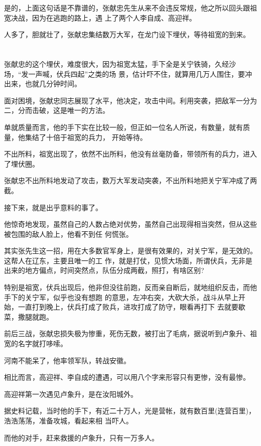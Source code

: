 \documentclass[11pt,a4paper,onecolumn]{article}
\begin{document}
是的，上面这句话是不靠谱的，张献忠先生从来不会违反常规，他之所以回头跟祖宽决战，因为在逃跑的路上，遇
上了两个人\myrule 李自成、高迎祥。

人多了，胆就壮了，张献忠集结数万大军，在龙门设下埋伏，等待祖宽的到来。

\section[\thesection]{}

张献忠的这个埋伏，难度很大，因为祖宽太猛，手下全是关宁铁骑，久经沙场，``发一声喊，伏兵四起''之类的场
景，估计吓不住，就算用几万人围住，要冲出来，也就几分钟时间。

面对困境，张献忠同志展现了水平，他决定，攻击中间。利用突袭，把敌军一分为二，分而击破，这是唯一的方法。

单就质量而言，他的手下实在比较一般，但正如一位名人所说，有数量，就有质量，他集结了十倍于祖宽的兵力，
开始等待。

不出所料，祖宽出现了，依然不出所料，他没有丝毫防备，带领所有的兵力，进入了埋伏圈。

张献忠不出所料地发动了攻击，数万大军发动突袭，不出所料地把关宁军冲成了两截。

接下来，就是出乎意料的事了。

他惊奇地发现，虽然自己的人数占绝对优势，虽然自己出现得相当突然，但从这些被包围的敌人脸上，他看不到任
何慌张。

其实张先生这一招，用在大多数官军身上，是很有效果的，对关宁军，是无效的。这帮人在辽东，主要且唯一的工
作，就是打仗，见惯大场面，所谓伏兵，无非是出来的地方偏点，时间突然点，队伍分成两截，照打，有啥区别?

特别是祖宽，伏兵出现后，他非但没往前跑，反而亲自断后，就地组织反击，而他手下的关宁军，似乎也没有想跑
的意思，左冲右突，大砍大杀，战斗从早上开始，一直打到晚上，伏兵打成了败兵，进攻打成了防守，眼看再打下
去就要歇菜，撒腿就跑。

前后三战，张献忠损失极为惨重，死伤无数，被打出了毛病，据说听到卢象升、祖宽的名字就打哆嗦。

河南不能呆了，他率领军队，转战安徽。

相比而言，高迎祥、李自成的遭遇，可以用八个字来形容\myrule 只有更惨，没有最惨。

高迎祥第一次遇见卢象升，是在汝阳城外。

据史料记载，当时他的手下，有近二十万人，光是营帐，就有数百里(连营百里)，浩浩荡荡，准备攻城，看起来相
当吓人。

而他的对手，赶来救援的卢象升，只有一万多人。
\end{document}
